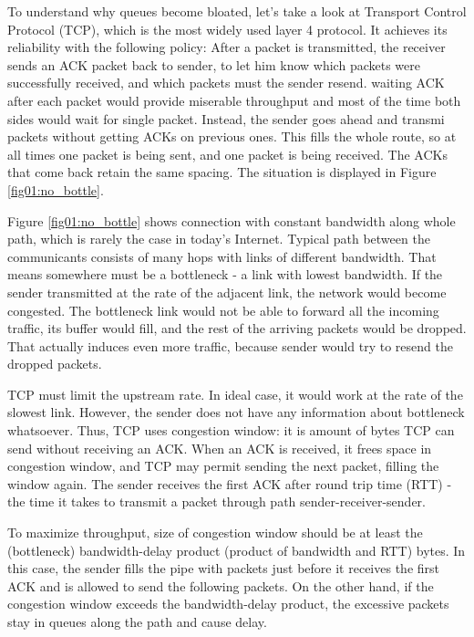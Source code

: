 To understand why queues become bloated, let's take a look at Transport  Control Protocol (TCP), which is  the most widely used layer 4 protocol. It achieves its reliability with the following policy: After a packet is transmitted, the receiver sends an ACK packet back to sender, to let him know which packets were successfully received, and which packets must the sender resend.  waiting  ACK after each packet would provide miserable throughput and most of the time both sides would wait for single packet. Instead, the sender goes ahead and transmi packets without getting ACKs on previous ones. This fills the whole route, so at all times one packet is being sent, and one packet is being received. The ACKs that come back retain the same spacing. The situation is displayed in Figure \ref{fig01:no_bottle}.


Figure \ref{fig01:no_bottle} shows connection with constant bandwidth along whole path, which is rarely the case in today's Internet. Typical path between the communicants consists of many hops with links of different bandwidth. That means somewhere must be a bottleneck - a link with lowest bandwidth. If the sender transmitted at the rate of the adjacent link, the network would become congested. The bottleneck link would not be able to forward all the incoming traffic, its buffer would fill, and the rest of the arriving packets would be dropped. That actually induces even more traffic, because sender would try to resend the dropped packets.


TCP must limit the upstream rate. In ideal case, it would work at the rate of the slowest link. However, the sender does not have any information about bottleneck whatsoever. Thus, TCP uses congestion window: it is amount of bytes TCP can send without receiving an ACK. When an ACK is received, it frees space in congestion window, and TCP may permit sending the next packet, filling the window again. The sender receives the first ACK after round trip time (RTT) - the time it takes to transmit a packet through path sender-receiver-sender.

To maximize throughput, size of congestion window should be at least the (bottleneck) bandwidth-delay product (product of bandwidth and RTT) bytes. In this case, the sender fills the pipe with packets just before it receives the first ACK and is allowed to send the following packets. On the other hand, if the congestion window exceeds the bandwidth-delay product, the excessive packets stay in queues along the path and cause delay. 

